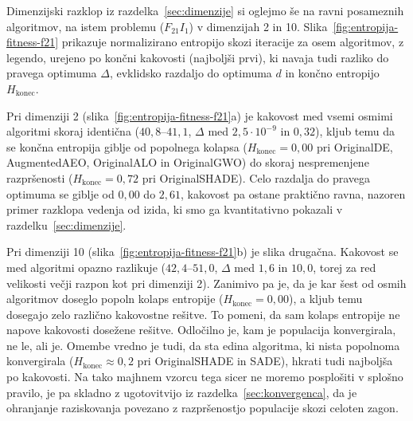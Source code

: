 \documentclass[a4paper, 12pt]{book}
\newcommand{\prob}[2]{F_{#1}I_{#2}}
\begin{document}
Dimenzijski razklop iz razdelka~\ref{sec:dimenzije} si oglejmo še na ravni
posameznih algoritmov, na istem problemu ($\prob{21}{1}$) v dimenzijah 2 in 10.
Slika~\ref{fig:entropija-fitness-f21} prikazuje normalizirano entropijo
skozi iteracije za osem algoritmov, z legendo, urejeno po končni kakovosti 
(najboljši prvi), ki navaja tudi razliko do
pravega optimuma $\Delta$, evklidsko razdaljo do optimuma $d$ in končno
entropijo $H_{\text{konec}}$.

Pri dimenziji 2 (slika~\ref{fig:entropija-fitness-f21}a) je kakovost med
vsemi osmimi algoritmi skoraj identična ($40{,}8$--$41{,}1$, $\Delta$ med
$2{,}5 \cdot 10^{-9}$ in $0{,}32$), kljub temu da se končna entropija giblje
od popolnega kolapsa ($H_{\text{konec}} = 0{,}00$ pri OriginalDE,
AugmentedAEO, OriginalALO in OriginalGWO) do skoraj nespremenjene
razpršenosti ($H_{\text{konec}} = 0{,}72$ pri OriginalSHADE). Celo razdalja
do pravega optimuma se giblje od $0{,}00$ do $2{,}61$, kakovost pa ostane praktično ravna, nazoren primer razklopa vedenja od izida, ki smo ga
kvantitativno pokazali v razdelku~\ref{sec:dimenzije}.

Pri dimenziji 10 (slika~\ref{fig:entropija-fitness-f21}b) je slika
drugačna. Kakovost se med algoritmi opazno razlikuje ($42{,}4$--$51{,}0$,
$\Delta$ med $1{,}6$ in $10{,}0$, torej za red velikosti večji razpon kot
pri dimenziji 2). Zanimivo pa je, da je kar šest od osmih algoritmov
doseglo popoln kolaps entropije ($H_{\text{konec}} = 0{,}00$), a kljub temu
dosegajo zelo različno kakovostne rešitve. To pomeni, da sam kolaps
entropije ne napove kakovosti dosežene rešitve. Odločilno je, kam
je populacija konvergirala, ne le, ali je. Omembe vredno je tudi, da sta
edina algoritma, ki nista popolnoma konvergirala
($H_{\text{konec}} \approx 0{,}2$ pri OriginalSHADE in SADE), hkrati tudi najboljša po kakovosti. Na tako majhnem vzorcu tega sicer ne moremo
posplošiti v splošno pravilo, je pa skladno z ugotovitvijo iz
razdelka~\ref{sec:konvergenca}, da je ohranjanje raziskovanja povezano z
razpršenostjo populacije skozi celoten zagon.
\end{document}
